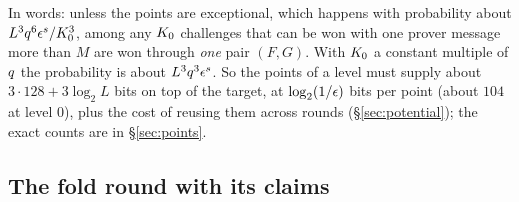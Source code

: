 In words: unless the points are exceptional, which happens with probability about $L^3q^6\epsilon^s/K_0^3$, among any $K_0$ challenges that can be won with one prover message more than $M$ are won through \emph{one} pair $(F,G)$. With $K_0$ a constant multiple of $q$ the probability is about $L^3q^3\epsilon^s$. So the points of a level must supply about $3\cdot128+3\log_2L$ bits on top of the target, at $\log_2(1/\epsilon)$ bits per point (about $104$ at level $0$), plus the cost of reusing them across rounds (\S\ref{sec:potential}); the exact counts are in \S\ref{sec:points}.

\subsection{The fold round with its claims}\label{sec:F}

